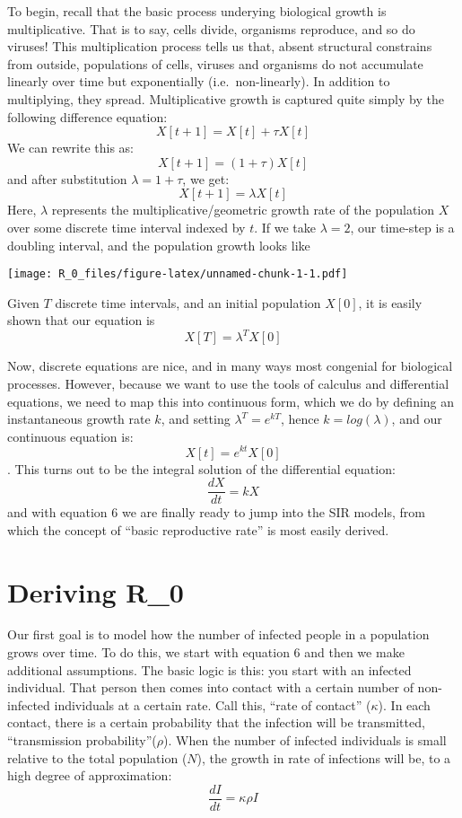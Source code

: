\documentclass[]{article}
\begin{document}
To begin, recall that the basic process underying biological growth is
multiplicative. That is to say, cells divide, organisms reproduce, and
so do viruses! This multiplication process tells us that, absent
structural constrains from outside, populations of cells, viruses and
organisms do not accumulate linearly over time but exponentially
(i.e.~non-linearly). In addition to multiplying, they spread.
Multiplicative growth is captured quite simply by the following
difference equation: \[\tag{1} X[t+1] = X[t] + \tau X[t]\] We can
rewrite this as: \[\tag{2} X[t+1] = (1 + \tau) X[t]\] and after
substitution \(\lambda = 1 + \tau\), we get:
\[\tag{3} X[t+1] = \lambda X[t]\] Here, \(\lambda\) represents the
multiplicative/geometric growth rate of the population \(X\) over some
discrete time interval indexed by \(t\). If we take \(\lambda = 2\), our
time-step is a doubling interval, and the population growth looks like

\texttt{[image: R\_0\_files/figure-latex/unnamed-chunk-1-1.pdf]}

Given \(T\) discrete time intervals, and an initial population \(X[0]\),
it is easily shown that our equation is
\[\tag{4} X[T] = \lambda^T X[0]\]

Now, discrete equations are nice, and in many ways most congenial for
biological processes. However, because we want to use the tools of
calculus and differential equations, we need to map this into continuous
form, which we do by defining an instantaneous growth rate \(k\), and
setting \(\lambda^T = e^{kT}\), hence \(k=log(\lambda)\), and our
continuous equation is: \[\tag{5} X[t] = e^{kt} X[0]\]. This turns out
to be the integral solution of the differential equation:
\[\tag{6} \frac{dX}{dt} = kX\] and with equation 6 we are finally ready
to jump into the SIR models, from which the concept of ``basic
reproductive rate'' is most easily derived.

\section{Deriving R\_0}\label{deriving-r_0}

Our first goal is to model how the number of infected people in a
population grows over time. To do this, we start with equation 6 and
then we make additional assumptions. The basic logic is this: you start
with an infected individual. That person then comes into contact with a
certain number of non-infected individuals at a certain rate. Call this,
``rate of contact'' (\(\kappa\)). In each contact, there is a certain
probability that the infection will be transmitted, ``transmission
probability''(\(\rho\)). When the number of infected individuals is
small relative to the total population (\(N\)), the growth in rate of
infections will be, to a high degree of approximation:
\[\tag{7} \frac{dI}{dt} = \kappa \rho I\]
\end{document}

